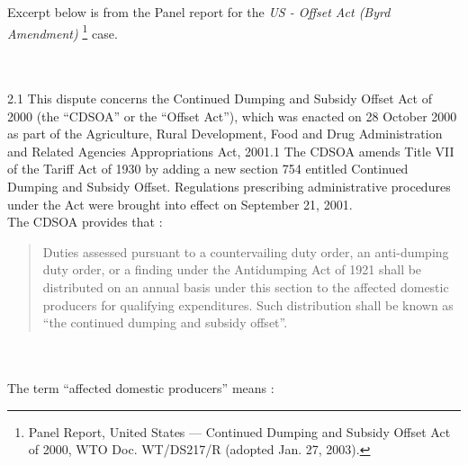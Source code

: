 Excerpt below is from the Panel report for the 
\textit{US - Offset Act (Byrd Amendment)}
\footnote{Panel Report, United States — Continued Dumping and Subsidy Offset Act of 2000, WTO Doc. WT/DS217/R (adopted Jan. 27, 2003).} case.\\

\begin{tcolorbox}[breakable]
\\\\
2.1 \quad This dispute concerns the Continued Dumping and Subsidy Offset Act of 2000 (the
“CDSOA” or the “Offset Act”), which was enacted on 28 October 2000 as part of the Agriculture,
Rural Development, Food and Drug Administration and Related Agencies Appropriations Act, 2001.1
The CDSOA amends Title VII of the Tariff Act of 1930 by adding a new section 754 entitled
Continued Dumping and Subsidy Offset. Regulations prescribing administrative procedures under the
Act were brought into effect on September 21, 2001.\\

 \quad The CDSOA provides that :

\blockquote{
    Duties assessed pursuant to a countervailing duty order, an anti-dumping duty order,
    or a finding under the Antidumping Act of 1921 shall be distributed on an annual
    basis under this section to the affected domestic producers for qualifying
    expenditures. Such distribution shall be known as “the continued dumping and
    subsidy offset”.
    }
\\\\
 \quad The term “affected domestic producers” means :


\end{tcolorbox}
